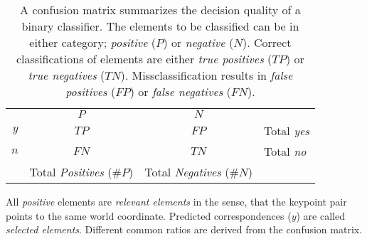\begin{table}
\bgroup%
\def\arraystretch{1.5}%
\setlength\tabcolsep{0.5em}
\begin{tabular}{r|c|c|l}
    \multicolumn{1}{r}{} &
    \multicolumn{1}{c}{$P$} &
    \multicolumn{1}{c}{$N$} &
    \multicolumn{1}{l}{} \\
  \cline{2-3}
  $y$ & $TP$  & $FP$ & Total \emph{yes} \\
  \cline{2-3}
  $n$ & $FN$  & $TN$ & Total \emph{no} \\
  \cline{2-3}
    \multicolumn{1}{r}{} &
    \multicolumn{1}{c}{Total \emph{Positives} ($\#P$)} &
    \multicolumn{1}{c}{Total \emph{Negatives} ($\#N$)}
\end{tabular}
\egroup%
\caption[Definition of the Confusion Matrix]{A confusion matrix summarizes the decision quality of a binary classifier. The elements to be classified can be in either category; \emph{positive} ($P$) or \emph{negative} ($N$). Correct classifications of elements are either \emph{true positives} ($TP$) or \emph{true negatives} ($TN$). Missclassification results in \emph{false positives} ($FP$) or \emph{false negatives} ($FN$).}\label{tab:def_confusion_matrix}
\end{table}

All \emph{positive} elements are \emph{relevant elements} in the sense, that the keypoint pair points to the same world coordinate.
Predicted correspondences ($y$) are called \emph{selected elements}.
Different common ratios are derived from the confusion matrix.

